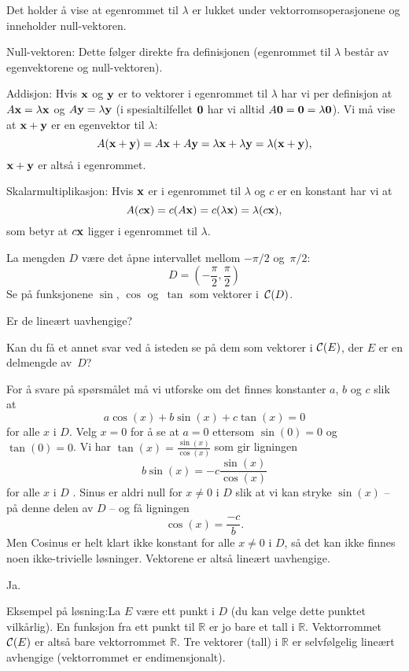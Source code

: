 \begin{losning}
Det holder å vise at egenrommet til $\lambda$ er lukket under vektorromsoperasjonene og inneholder null-vektoren.

\noindent
Null-vektoren: Dette følger direkte fra definisjonen (egenrommet til $\lambda$ består av egenvektorene og null-vektoren).


\noindent
Addisjon: Hvis $\mathbf{x}$ og $\mathbf{y}$ er to vektorer i egenrommet til $\lambda$ har vi per definisjon at $A\mathbf{x}=\lambda \mathbf{x}$ og $A\mathbf{y}=\lambda \mathbf{y}$ (i spesialtilfellet $\mathbf{0}$ har vi alltid $A\mathbf{0}=\mathbf{0}=\lambda \mathbf{0}$). Vi må vise at $\mathbf{x}+\mathbf{y}$ er en egenvektor til $\lambda$: $$A(\mathbf{x}+\mathbf{y})=A\mathbf{x}+A\mathbf{y}=\lambda \mathbf{x}+ \lambda \mathbf{y}=\lambda(\mathbf{x}+\mathbf{y}),$$ $\mathbf{x}+\mathbf{y}$ er altså i egenrommet.

\noindent
Skalarmultiplikasjon: Hvis $\mathbf{x}$ er i egenrommet til $\lambda$ og $c$ er en konstant har vi at $$A(c\mathbf{x})=c(A \mathbf{x})=c(\lambda \mathbf{x})=\lambda(c \mathbf{x}),$$ som betyr at $c\mathbf{x}$ ligger i egenrommet til $\lambda$.
\end{losning}





\begin{oppgave}
La mengden $D$ være det åpne intervallet mellom $-\pi/2$ og~$\pi/2$:
\[
D = \left( - \frac{\pi}{2}, \frac{\pi}{2} \right)
\]
Se på funksjonene $\sin$, $\cos$ og~$\tan$ som vektorer i~$\mathcal{C}(D)$.
\begin{punkt}
Er de lineært uavhengige?
\end{punkt}
\begin{punkt}
Kan du få et annet svar ved å isteden se på dem som vektorer i
$\mathcal{C}(E)$, der $E$ er en delmengde av~$D$?
\end{punkt}
\end{oppgave}

\begin{losning}
\begin{punkt}
For å svare på spørsmålet må vi utforske om det finnes konstanter $a$, $b$ og $c$ slik at $$a\cos(x)+b\sin(x)+c\tan(x)=0$$ for alle $x$ i $D$. Velg $x=0$ for å se at $a=0$ ettersom $\sin(0)=0$ og $\tan(0)=0$. Vi har $\tan(x)=\frac{\sin(x)}{\cos(x)}$ som gir ligningen $$b\sin(x)=-c\frac{\sin(x)}{\cos(x)}$$ for alle $x$ i $D$ . Sinus er aldri null for $x\neq 0$ i $D$ slik at vi kan stryke $\sin(x)$ -- på denne delen av $D$ -- og få ligningen $$\cos(x)=\frac{-c}{b}.$$ Men Cosinus er helt klart ikke konstant for alle $x\neq 0$ i $D$, så det kan ikke finnes noen ikke-trivielle løsninger. Vektorene er altså lineært uavhengige.
\end{punkt}

\begin{punkt}
Ja. 

\noindent
Eksempel på løsning:La $E$ være ett punkt i $D$ (du kan velge dette punktet vilkårlig). En funksjon fra ett punkt til $\mathbb{R}$ er jo bare et tall i $\mathbb{R}$. Vektorrommet $\mathcal{C}(E)$ er altså bare vektorrommet $\mathbb{R}$. Tre vektorer (tall) i $\mathbb{R}$ er selvfølgelig lineært avhengige (vektorrommet er endimensjonalt).
\end{punkt}

\end{losning}


